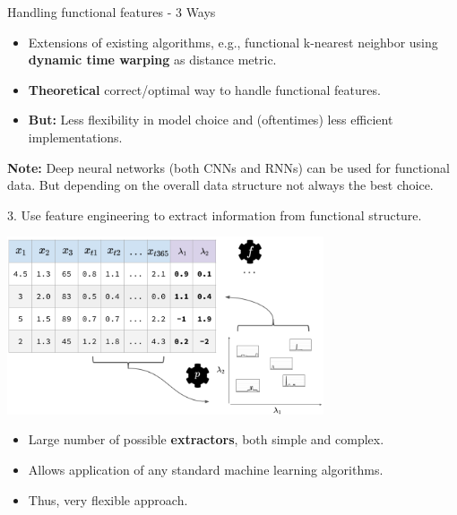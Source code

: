 \begin{vbframe}{Handling functional features - 3 Ways}
    \vspace*{-1cm}
    
    \begin{itemize}
        \item Extensions of existing algorithms, e.g., functional k-nearest neighbor using \textbf{dynamic time warping} as distance metric.
        \item \textbf{Theoretical} correct/optimal way to handle functional features.
        \item \textbf{But:} Less flexibility in model choice and (oftentimes) less efficient implementations.
    \end{itemize}
    
    \begin{footnotesize}
        \textbf{Note:} Deep neural networks (both CNNs and RNNs) can be used for functional data. But depending on the overall data structure not always the best choice.
    \end{footnotesize}
    
    \framebreak
    
    3. Use feature engineering to extract information from functional structure.
    
    \vspace*{-0.2cm}
    
    \begin{center}
        \includegraphics[width = 0.7\textwidth]{figure_man/extract.png}
    \end{center}
    
    \vspace*{-0.6cm}
    
    \begin{itemize}
        \item Large number of possible \textbf{extractors}, both simple and complex.
        \item Allows application of any standard machine learning algorithms.
        \item Thus, very flexible approach.
    \end{itemize}
\end{vbframe}

